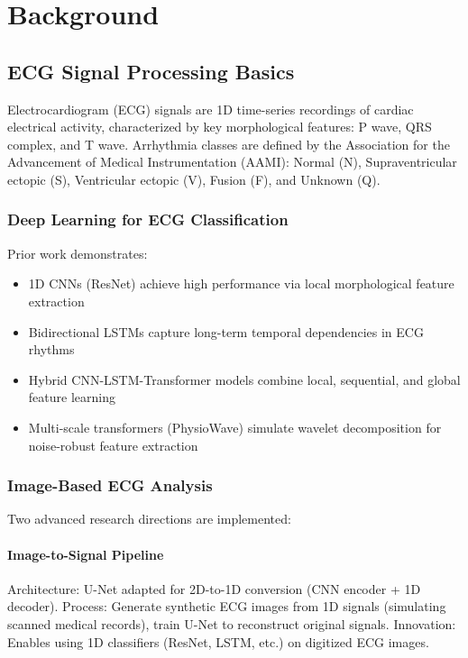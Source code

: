 \part{Background}

\chapter{ECG Signal Processing Basics}
\label{chap:background}

Electrocardiogram (ECG) signals are 1D time-series recordings of cardiac electrical activity, characterized by key morphological features: P wave, QRS complex, and T wave. Arrhythmia classes are defined by the Association for the Advancement of Medical Instrumentation (AAMI): Normal (N), Supraventricular ectopic (S), Ventricular ectopic (V), Fusion (F), and Unknown (Q).

\section{Deep Learning for ECG Classification}
Prior work demonstrates:
\begin{itemize}
    \item 1D CNNs (ResNet) achieve high performance via local morphological feature extraction
    \item Bidirectional LSTMs capture long-term temporal dependencies in ECG rhythms
    \item Hybrid CNN-LSTM-Transformer models combine local, sequential, and global feature learning
    \item Multi-scale transformers (PhysioWave) simulate wavelet decomposition for noise-robust feature extraction
\end{itemize}

\section{Image-Based ECG Analysis}
Two advanced research directions are implemented:

\subsection{Image-to-Signal Pipeline}
Architecture: U-Net adapted for 2D-to-1D conversion (CNN encoder + 1D decoder). Process: Generate synthetic ECG images from 1D signals (simulating scanned medical records), train U-Net to reconstruct original signals. Innovation: Enables using 1D classifiers (ResNet, LSTM, etc.) on digitized ECG images.

